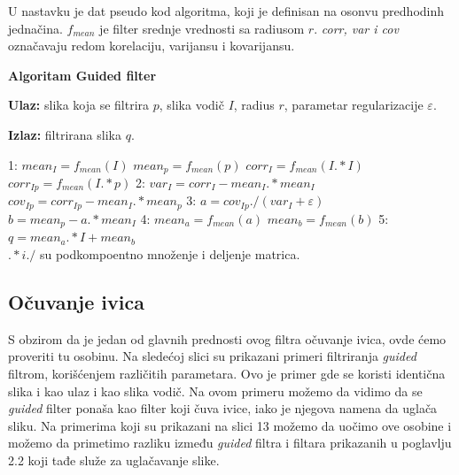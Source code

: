\documentclass[a4paper,12pt,titlepage]{article}
\begin{document}
U nastavku je dat pseudo kod algoritma, koji je definisan na osonvu predhodinh jednačina. $f_{mean}$ je filter srednje vrednosti sa radiusom $r$. \emph{corr, var i cov} označavaju redom korelaciju, varijansu i kovarijansu. 

\newpage

\textbf{Algoritam Guided filter}

\textbf{Ulaz:} slika koja se filtrira $p$, slika vodič $I$, radius $r$, parametar regularizacije $\varepsilon$.

\textbf{Izlaz:} filtrirana slika $q$.

1: $mean_I = f_{mean}(I)$
\hspace{4mm} $mean_p = f_{mean}(p)$
\hspace{4mm} $corr_I = f_{mean}(I .* I)$
\hspace{4mm} $corr_{Ip} = f_{mean}(I .* p)$
2: $var_I = corr_I - mean_I .* mean_I$
\hspace{4mm}  $cov_{Ip} = corr_{Ip} - mean_I .* mean_p$
3: $a = cov_{Ip} ./ (var_I + \varepsilon)$
\hspace{4mm} $b = mean_p - a .*  mean_I$
4: $mean_a = f_{mean}(a)$
\hspace{4mm} $mean_b = f_{mean}(b)$
5: $q = mean_a .* I + mean_b$\\

$ .*  i  ./ $ su podkompoentno množenje i deljenje matrica.


\subsection{Očuvanje ivica}%

S obzirom da je jedan od glavnih prednosti ovog filtra očuvanje ivica, ovde ćemo proveriti tu osobinu. Na sledećoj slici su prikazani primeri filtriranja \emph{guided} filtrom, korišćenjem različitih parametara. Ovo je primer gde se koristi identična slika i kao ulaz i kao slika vodič. Na ovom primeru možemo da vidimo da se \emph{guided} filter ponaša kao filter koji čuva ivice, iako je njegova namena da uglača sliku. 
Na primerima koji su prikazani na slici 13 možemo da uočimo ove osobine i možemo da primetimo razliku između \emph{guided} filtra i filtara prikazanih u poglavlju 2.2 koji tađe služe za uglačavanje slike.
\end{document}
